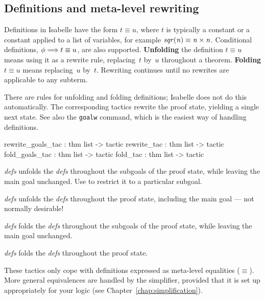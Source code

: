 \subsection{Definitions and meta-level rewriting} \label{sec:rewrite_goals}

Definitions in Isabelle have the form $t\equiv u$, where $t$ is typically a
constant or a constant applied to a list of variables, for example $\it
sqr(n)\equiv n\times n$.  Conditional definitions, $\phi\Longrightarrow t\equiv u$,
are also supported.  {\bf Unfolding} the definition ${t\equiv u}$ means using
it as a rewrite rule, replacing~$t$ by~$u$ throughout a theorem.  {\bf
Folding} $t\equiv u$ means replacing~$u$ by~$t$.  Rewriting continues until
no rewrites are applicable to any subterm.

There are rules for unfolding and folding definitions; Isabelle does not do
this automatically.  The corresponding tactics rewrite the proof state,
yielding a single next state.  See also the {\tt goalw} command, which is the
easiest way of handling definitions.
\begin{ttbox} 
rewrite_goals_tac : thm list -> tactic
rewrite_tac       : thm list -> tactic
fold_goals_tac    : thm list -> tactic
fold_tac          : thm list -> tactic
\end{ttbox}
\begin{ttdescription}
\item[\ttindexbold{rewrite_goals_tac} {\it defs}]  
unfolds the {\it defs} throughout the subgoals of the proof state, while
leaving the main goal unchanged.  Use  to restrict it to a
particular subgoal.

\item[\ttindexbold{rewrite_tac} {\it defs}]  
unfolds the {\it defs} throughout the proof state, including the main goal
--- not normally desirable!

\item[\ttindexbold{fold_goals_tac} {\it defs}]  
folds the {\it defs} throughout the subgoals of the proof state, while
leaving the main goal unchanged.

\item[\ttindexbold{fold_tac} {\it defs}]  
folds the {\it defs} throughout the proof state.
\end{ttdescription}

\begin{warn}
  These tactics only cope with definitions expressed as meta-level
  equalities ($\equiv$).  More general equivalences are handled by the
  simplifier, provided that it is set up appropriately for your logic
  (see Chapter~\ref{chap:simplification}).
\end{warn}

